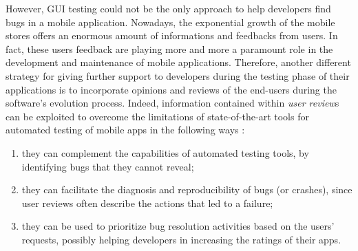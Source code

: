 However, GUI testing could not be the only approach to help developers find bugs in a mobile application. Nowadays, the exponential growth of the mobile stores offers an enormous amount of informations and feedbacks from users. In fact, these users feedback are playing more and more a paramount role in the development and maintenance of mobile applications. Therefore, another different strategy for giving further support to developers during the testing phase of their applications is to incorporate opinions and reviews of the end-users during the software's evolution process. \newline
Indeed, information contained within \textit{user review}s can be exploited to overcome the limitations of state-of-the-art tools for automated testing of mobile apps in the following ways \cite{cristal}: 
\begin{enumerate}
\item they can complement the capabilities of automated testing tools, by identifying bugs that they cannot reveal; 
\item they can facilitate the diagnosis and reproducibility of bugs (or crashes), since user reviews often describe the actions that led to a failure; 
\item they can be used to prioritize bug resolution activities based on the users' requests, possibly helping developers in increasing the ratings of their apps.
\end{enumerate} 

